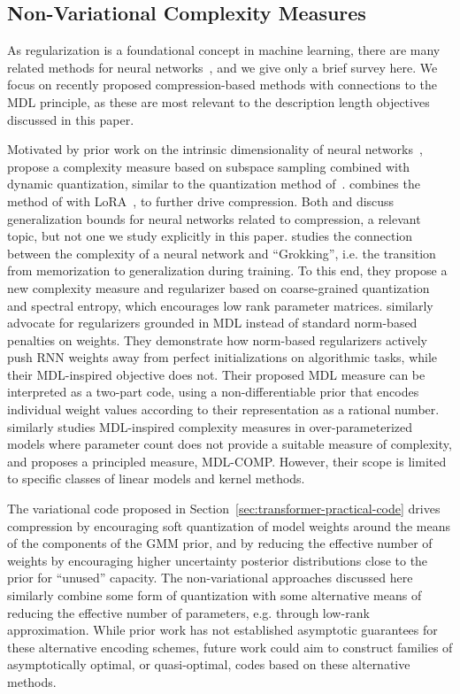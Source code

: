 \subsection{Non-Variational Complexity Measures}\label{sec:non-variational-related-work} As regularization is a foundational concept in machine learning, there are many related methods for neural networks~\citep{jiang2020fantastic}, and we give only a brief survey here. We focus on recently proposed compression-based methods with connections to the MDL principle, as these are most relevant to the description length objectives discussed in this paper.

Motivated by prior work on the intrinsic dimensionality of neural networks~\citep{li2018measuring}, \citet{lotfi2022pac} propose a complexity measure based on subspace sampling combined with dynamic quantization, similar to the quantization method of~\citet{han2016deep}. 
\citet{lotfi2024non} combines the method of \citet{lotfi2022pac} with LoRA~\citep{hu2022lora,dettmers2023qlora}, to further drive compression. Both \citet{lotfi2022pac} and \citet{lotfi2024non} discuss generalization bounds for neural networks related to compression, a relevant topic, but not one we study explicitly in this paper.
\citet{demoss2025complexity} studies the connection between the complexity of a neural network and ``Grokking'', i.e. the transition from memorization to generalization during training. To this end, they propose a new complexity measure and regularizer based on coarse-grained quantization and spectral entropy, which encourages low rank parameter matrices.
\citet{abudy2025minimum} similarly advocate for regularizers grounded in MDL instead of standard norm-based penalties on weights. They demonstrate how norm-based regularizers actively push RNN weights away from perfect initializations on algorithmic tasks, while their MDL-inspired objective does not. Their proposed MDL measure can be interpreted as a two-part code, using a non-differentiable prior that encodes individual weight values according to their representation as a rational number.
\citet{dwivedi2023revisiting} similarly studies MDL-inspired complexity measures in over-parameterized models where parameter count does not provide a suitable measure of complexity, and proposes a principled measure, MDL-COMP. However, their scope is limited to specific classes of linear models and kernel methods.

The variational code proposed in Section~\ref{sec:transformer-practical-code} drives compression by encouraging soft quantization of model weights around the means of the components of the GMM prior, and by reducing the effective number of weights by encouraging higher uncertainty posterior distributions close to the prior for ``unused'' capacity. The non-variational approaches discussed here similarly combine some form of quantization with some alternative means of reducing the effective number of parameters, e.g. through low-rank approximation. While prior work has not established asymptotic guarantees for these alternative encoding schemes, future work could aim to construct families of asymptotically optimal, or quasi-optimal, codes based on these alternative methods.


